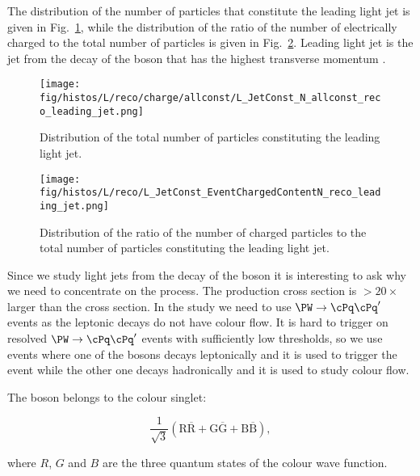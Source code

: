   The distribution of the number of particles that constitute the leading light jet is given in Fig.~\ref{fig:number}, while the distribution of the ratio of the number of electrically charged to the total number of particles is given in Fig.~\ref{fig:charged_content}. Leading light jet is the jet from the decay of the \PW boson that has the highest transverse momentum \pt.

  \begin{figure}[hbtp]
    \centering
    \def\twidth{0.45}
    \texttt{[image: fig/histos/L/reco/charge/allconst/L\_JetConst\_N\_allconst\_reco\_leading\_jet.png]}
    \caption{Distribution of the total number of particles constituting the leading light jet.}
    \label{fig:number}

\end{figure}
     \begin{figure}[hbtp]
     \centering
     \def\twidth{0.45}
     \texttt{[image: fig/histos/L/reco/L\_JetConst\_EventChargedContentN\_reco\_leading\_jet.png]}
     \caption{Distribution of the ratio of the number of charged particles to the total number of particles constituting the leading light jet.}
  \label{fig:charged_content}
   \end{figure}

Since we study light jets from the decay of the \PW boson it is interesting to ask why we need to concentrate on the \ttbar process. The \PW production cross section is $>20\times$ larger than the \ttbar cross section. In the study we need to use  $\PW\rightarrow\cPq\cPq'$ events as the leptonic decays do not have colour flow. It is hard to trigger on resolved $\PW\rightarrow\cPq\cPq'$ events with sufficiently low \pt thresholds, so we use \ttbar events where one of the \PW bosons decays leptonically and it is used to trigger the event while the other one decays hadronically and it is used to study colour flow.

The \PW boson belongs to the colour singlet:

\begin{equation}
\frac{1}{\sqrt{3}}\left(\text{R}\overline{\text{R}}+\text{G}\overline{\text{G}}+\text{B}\overline{\text{B}}\right),
\end{equation}

where $R$, $G$ and $B$ are the three quantum states of the colour wave function.

